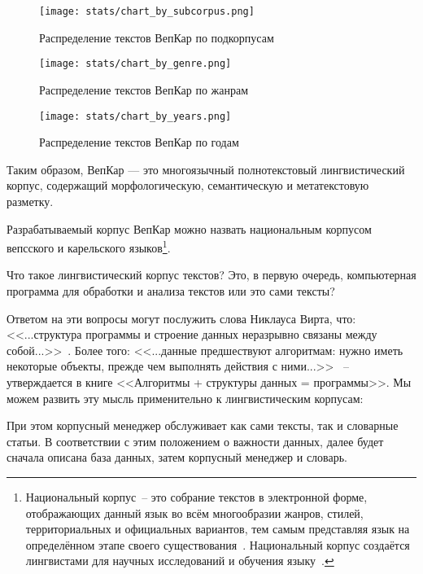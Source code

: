 \begin{figure}
    \centering
   \texttt{[image: stats/chart\_by\_subcorpus.png]}
\caption{Распределение текстов ВепКар по подкорпусам}
 \label{fig:chart_by_corpus}
\end{figure}

\begin{figure}
    \centering
    \texttt{[image: stats/chart\_by\_genre.png]}
\caption{Распределение текстов ВепКар по жанрам}
 \label{fig:chart_by_genre}
\end{figure}

\begin{figure}
    \centering
    \texttt{[image: stats/chart\_by\_years.png]}
\caption{Распределение текстов ВепКар по годам}
 \label{fig:chart_by_year}
\end{figure}

Таким образом, ВепКар — это многоязычный полнотекстовый лингвистический корпус, содержащий морфологическую, семантическую и метатекстовую разметку.

Разрабатываемый корпус ВепКар можно назвать национальным корпусом 
вепсского и карельского языков\footnote{ Национальный корпус~-- это собрание текстов 
в электронной форме, 
отображающих данный язык во всём многообразии жанров, стилей, территориальных и официальных вариантов, 
тем самым представляя язык на определённом этапе своего существования~\cite[с.~418]{Kibrik2019}. 
Национальный корпус создаётся лингвистами для научных исследований и обучения языку~\cite[с.~419]{Kibrik2019}.
}.

Что такое лингвистический корпус текстов? Это, в первую очередь, компьютерная программа для обработки и анализа текстов или это сами тексты? 

Ответом на эти вопросы могут послужить слова Никлауса Вирта, что: 
<<...структура программы и строение данных неразрывно связаны между собой...>>~\cite[с.~9]{Wirth1989AlgorithmsAndDataStructure}. 
Более того:   
<<...данные предшествуют алгоритмам: нужно иметь некоторые объекты, 
прежде чем выполнять действия с ними...>>~\cite[с.~8]{Wirth1985Algorithms+} 
-- утверждается в книге <<Алгоритмы + структуры данных = программы>>.
Мы можем развить эту мысль применительно к лингвистическим корпусам:
        

\noindent
При этом корпусный менеджер обслуживает как сами тексты, так и словарные статьи. 
В соответствии с этим положением о важности данных, далее будет  
сначала описана база данных, затем корпусный менеджер и словарь.

 

 











